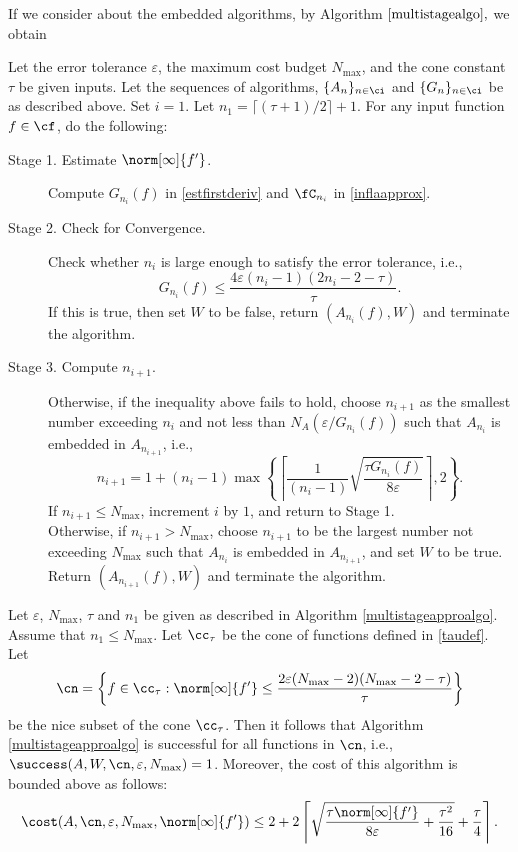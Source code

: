 If we consider about the embedded algorithms, by Algorithm $\ref{multistagealgo},$ we obtain
\begin{algo} \label{multistageapproalgo}
Let the error tolerance $\varepsilon$, the maximum cost budget $N_{\max}$, and the cone constant $\tau$ be given inputs. Let the sequences of algorithms, $\{A_n\}_{n \in \ci}$ and  $\{G_n\}_{n \in \ci}$ be as described above.  Set $i=1$.  Let $n_1=\lceil (\tau+1)/2\rceil + 1$. For any input function $f \in \cf$, do the following:
\begin{description}

\item [Stage 1. Estimate {$\norm[\infty]{f'} $}.]
Compute $G_{n_i}(f)$ in \eqref{estfirstderiv} and $\fC_{n_i}$ in \eqref{inflaapprox}.

\item [Stage 2. Check for Convergence.]
Check whether $n_i$ is large enough to satisfy the error tolerance, i.e.,
$$
G_{n_i}(f) \le \frac{4\varepsilon (n_i-1)(2n_i-2 -\tau)}{\tau} .
$$
If this is true, then set $W$ to be false, return $(A_{n_i}(f),W)$ and terminate the algorithm.


\item[Stage 3. Compute $n_{i+1}$.]  Otherwise, if the inequality above fails to hold,
choose $n_{i+1}$ as the smallest number exceeding $n_i$ and not less than $N_{A}(\varepsilon /G_{n_i}(f))$ such that $A_{n_{i}}$ is embedded in $A_{n_{i+1}}$, i.e., 
$$
n_{i+1}=1+ (n_i-1)\max\left\{\left\lceil\frac{1}{(n_i-1)}\sqrt{\frac{\tau G_{n_i}(f)}{8\varepsilon}}\right\rceil,2\right\}.
$$
 If $n_{i+1} \le N_{\max}$, increment $i$ by $1$, and return to Stage 1.\\
Otherwise, if $n_{i+1} > N_{\max}$, choose $n_{i+1}$ to be the largest number not exceeding $N_{\max}$ such that $A_{n_{i}}$ is embedded in $A_{n_{i+1}}$, and set $W$ to be true. Return $(A_{n_{i+1}}(f),W)$ and terminate the algorithm.
\end{description}
\end{algo}

\begin{theorem}   Let  $\varepsilon$, $N_{\max}$, $\tau$ and $n_1$ be given as described in Algorithm \ref{multistageapproalgo}.  Assume that $n_1 \le N_{\max}$.  Let $\cc_\tau$ be the cone of functions defined in \eqref{taudef}.  Let
$$
\cn
= \left \{ f \in \cc_\tau : \norm[\infty]{f'} \le \frac{2\varepsilon (N_{\max}-2)(N_{\max}-2 -\tau)}{\tau} \right\}
$$
be the nice subset of the cone $\cc_\tau$.  Then it follows that Algorithm \ref{multistageapproalgo} is successful for all functions in $\cn$,  i.e.,  $\success(A,W,\cn,\varepsilon,N_{\max}) = 1$.  Moreover, the cost of this algorithm is bounded above as follows:
\begin{equation*}
\cost(A,\cn,\varepsilon,N_{\max},\norm[\infty]{f'})
\le 2 + 2 \left \lceil \sqrt{\frac{\tau \norm[\infty]{f'}}{8\varepsilon} + \frac{\tau^2 }{16}} + \frac{\tau}{4} \right\rceil.
\end{equation*}
\end{theorem}

